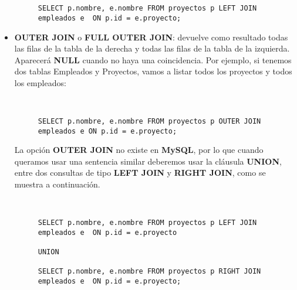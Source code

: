 \begin{itemize}
    \begin{figure}[H]
        \begin{tcolorbox}[sharp corners, colback=yellow!30, colframe=white!20]
            \scriptsize
            \begin{verbatim}


SELECT p.nombre, e.nombre FROM proyectos p LEFT JOIN empleados e  ON p.id = e.proyecto;
            \end{verbatim}
        \end{tcolorbox}
    \end{figure}

    \item \textbf{OUTER JOIN} o \textbf{FULL OUTER JOIN}: devuelve como resultado todas las filas de la tabla de la derecha y todas las filas de la tabla de la izquierda. Aparecerá \textbf{NULL} cuando no haya una coincidencia. Por ejemplo, si tenemos dos tablas Empleados y Proyectos, vamos a listar todos los proyectos y todos los empleados:

    \begin{figure}[H]
        \begin{tcolorbox}[sharp corners, colback=yellow!30, colframe=white!20]
            \scriptsize
            \begin{verbatim}


SELECT p.nombre, e.nombre FROM proyectos p OUTER JOIN empleados e ON p.id = e.proyecto;
            \end{verbatim}
        \end{tcolorbox}
    \end{figure}

    La opción \textbf{OUTER JOIN} no existe en \textbf{MySQL}, por lo que cuando queramos usar una sentencia similar deberemos usar la cláusula \textbf{UNION}, entre dos consultas de tipo \textbf{LEFT JOIN} y \textbf{RIGHT JOIN}, como se muestra a continuación.

    \begin{figure}[H]
        \begin{tcolorbox}[sharp corners, colback=yellow!30, colframe=white!20]
            \scriptsize
            \begin{verbatim}


SELECT p.nombre, e.nombre FROM proyectos p LEFT JOIN empleados e  ON p.id = e.proyecto

UNION

SELECT p.nombre, e.nombre FROM proyectos p RIGHT JOIN empleados e  ON p.id = e.proyecto;
            \end{verbatim}
        \end{tcolorbox}
    \end{figure}
\end{itemize}

